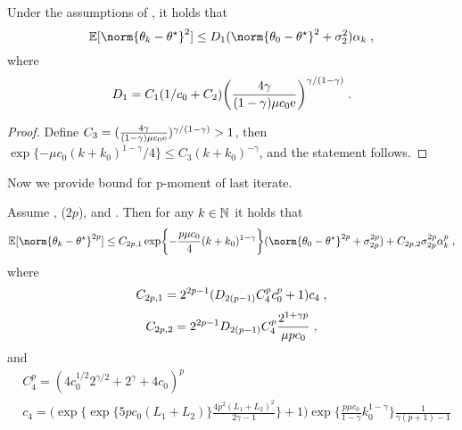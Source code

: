 \begin{corollary}
\label{cor:second_moment_bound}
Under the assumptions of ,  it holds that 
\begin{equation}
\PE[\norm{\theta_k-\thetas}^2]\leq D_1 (\norm{\theta_0-\thetas}^2 + \sigma_2^2) \alpha_k\eqsp,
\end{equation}
where 
\[
D_1 = C_1 (1/c_0 + C_{2}) \biggl(\frac{4\gamma}{(1-\gamma)\mu c_0 \mathrm{e}}\biggr)^{\gamma/(1-\gamma)}\;.
\]
\end{corollary}
\begin{proof}
Define $C_3 = (\frac{4\gamma}{(1-\gamma)\mu c_0 \mathrm{e}})^{\gamma/(1-\gamma)} > 1$, then  $\exp\{-\mu c_0(k+k_0)^{1-\gamma} / 4\}\leq C_3 (k+k_0)^{-\gamma}$, and the statement follows.
\end{proof}
Now we provide bound for p-moment of last iterate.
\begin{proposition}  \label{prop:2p-moment-bound} 
Assume , ($2p$),  and . Then for any $k \in \mathbb{N}$ it holds that
\begin{equation}
\PE[\norm{\theta_k - \thetas}^{2p}] \leq C_{2p,1}\exp\biggl\{-\frac{p\mu c_0}{4}(k+k_0)^{1-\gamma}\biggr\}(\norm{\theta_0-\thetas}^{2p} + \sigma_{2p}^{2p}) + C_{2p,2}\sigma_{2p}^{2p}\alpha_k^p\eqsp, 
\end{equation}
where 
\begin{equation}
    C_{2p,1} = 2^{2p-1}(D_{2(p-1)}C_4^pc_0^p + 1)c_4\;,
\end{equation}
\begin{equation}
    C_{2p,2} =2^{2p-1}D_{2(p-1)}C_4^p\frac{2^{1+\gamma p}}{\mu pc_0} \;,
\end{equation}
and 
\begin{equation}
\begin{split}
    &C_4^p = (4c_0^{1/2}2^{\gamma/2}+2^{\gamma}+ 4c_0)^p\\
    &c_4 = \biggl(\exp\biggl\{\exp\biggl\{5pc_0(L_1+L_2)\biggr\}\frac{4p^2(L_1+L_2)^2}{2\gamma-1}\biggr\} + 1\biggr)\exp\biggl\{\frac{p\mu c_0}{1-\gamma}k_0^{1-\gamma}\biggr\}\frac{1}{\gamma(p+1)-1}
\end{split}
\end{equation}
\end{proposition}
